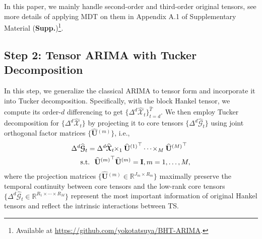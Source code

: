 \documentclass[letterpaper]{article} %
\numberwithin{theorem}{section}
\newcommand{\ten}[1]{ \boldsymbol{\mathcal #1}}
\newcommand{\bbR}[1]{\mathbb{R}^{#1}}
\begin{document}
In this paper, we mainly handle  second-order and third-order original tensors, see more details of applying MDT on them in Appendix A.1 of Supplementary Material (\textbf{Supp.})\footnote{Available at \url{https://github.com/yokotatsuya/BHT-ARIMA}.}.







\subsection{Step 2: Tensor ARIMA with Tucker Decomposition}
In this step,  we generalize the classical  ARIMA to tensor form and  incorporate it into  Tucker decomposition.  Specifically, with the block Hankel tensor,  we  compute its order-$d$ differencing   to  get $\{ \Delta^d  \widehat{\ten{X}}_t\}_{t=d}^{\widehat{T}}$.
We then  employ  Tucker decomposition for    $\{ \Delta^d  \widehat{\ten{X}}_t\}$ by  projecting  it  to  core tensors  $ \{ \Delta^d  \widehat{\ten{G}}_t\}$ using  joint orthogonal factor matrices $ \{\widehat{\mathbf U}{^{(m)}}\}$, i.e.,
\begin{equation}
\begin{aligned}\label{eq:Tucker_com0}
\small
\Delta^d & {\widehat{\ten{G}}_t}      =  \Delta^d  {\widehat{\ten{X}}_t} \hspace{-0.1cm} \times_1   \widehat{\mathbf U}{^{(1)}}^\top \cdots \hspace{-0.05cm}  \times_M \widehat{\mathbf U}{^{(M)}}^\top   \\& \text{s.t.}  \ \ \widehat{ \mathbf U}{^{(m)}}^\top \widehat{ \mathbf U}{^{(m)}} = \mathbf I, m=1,\ldots, M,
\end{aligned}
\end{equation}
where the projection matrices $ \{\widehat{\mathbf U}{^{(m)}} \in \bbR{J_m \times R_m} \}$  maximally preserve the temporal continuity between core tensors and the low-rank core tensors $ \{{ \Delta^d  \widehat{\ten{G}}_t}\in \bbR{R_1 \times \cdots \times R_M}\}$  represent the most important information of original Hankel tensors and reflect the intrinsic interactions between  TS.
\end{document}
